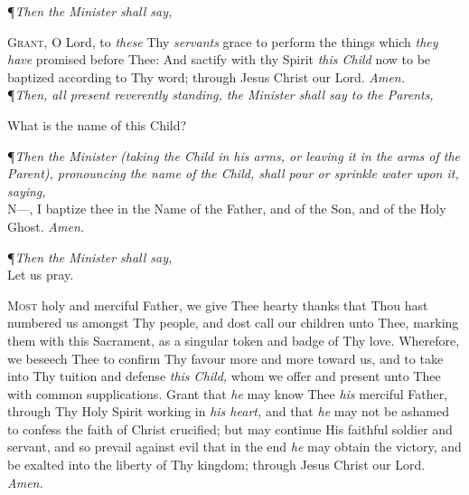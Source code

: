 {\centering \P\textit{Then the Minister shall say,} \par} 
\vspace{1ex}

\lettrine{G}{rant,} O Lord, to \textit{these} Thy \textit{servants} grace to perform the things which \textit{they have} promised before Thee:
And sactify with thy Spirit \textit{this Child} now to be baptized according to Thy word; through Jesus Christ our Lord.
\textit{Amen.} \\ 

\noindent\P\textit{Then, all present reverently standing, the Minister shall say to the Parents,}

{\centering What is the name of this Child? \par}
\vspace{1ex}

\noindent\P\textit{Then the Minister (taking the Child in his arms, or leaving it in the arms of the Parent), pronouncing the name of the Child, shall pour or sprinkle water upon it, saying,} \\

\lettrine{N}{---}, I baptize thee in the Name of the Father, and of the Son, and of the Holy Ghost.
\textit{Amen.} \\ 

\begin{center}
\P\textit{Then the Minister shall say,} \\
\vspace{1ex}
Let us pray. \\
\end{center}

\lettrine{M}{ost} holy and merciful Father, we give Thee hearty thanks that Thou hast numbered us amongst Thy people, and dost call our children unto Thee, marking them with this Sacrament, as a singular token and badge of Thy love.
Wherefore, we beseech Thee to confirm Thy favour more and more toward us, and to take into Thy tuition and defense \textit{this Child,} whom we offer and present unto Thee with common supplications.
Grant that \textit{he} may know Thee \textit{his} merciful Father, through Thy Holy Spirit working in \textit{his heart,} and that \textit{he} may not be ashamed to confess the faith of Christ crucified; but may continue His faithful soldier and servant, and so prevail against evil that in the end \textit{he} may obtain the victory, and be exalted into the liberty of Thy kingdom; through Jesus Christ our Lord.
\textit{Amen.} \\ 

